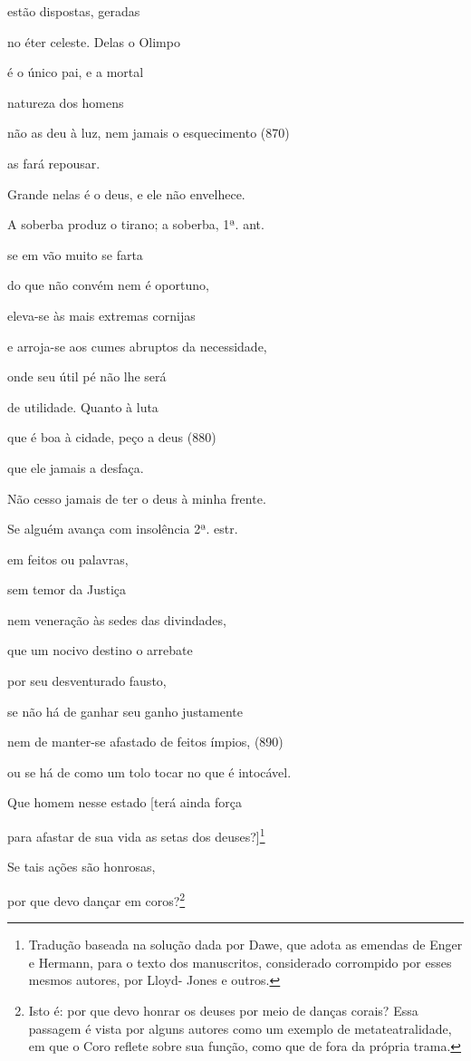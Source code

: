estão dispostas, geradas

no éter celeste. Delas o Olimpo

é o único pai, e a mortal

natureza dos homens

não as deu à luz, nem jamais o esquecimento (870)

as fará repousar.

Grande nelas é o deus, e ele não envelhece.

A soberba produz o tirano; a soberba, 1ª. ant.

se em vão muito se farta

do que não convém nem é oportuno,

eleva-se às mais extremas cornijas

e arroja-se aos cumes abruptos da necessidade,

onde seu útil pé não lhe será

de utilidade. Quanto à luta

que é boa à cidade, peço a deus (880)

que ele jamais a desfaça.

Não cesso jamais de ter o deus à minha frente.

Se alguém avança com insolência 2ª. estr.

em feitos ou palavras,

sem temor da Justiça

nem veneração às sedes das divindades,

que um nocivo destino o arrebate

por seu desventurado fausto,

se não há de ganhar seu ganho justamente

nem de manter-se afastado de feitos ímpios, (890)

ou se há de como um tolo tocar no que é intocável.

Que homem nesse estado {[}terá ainda força

para afastar de sua vida as setas dos deuses?{]}\footnote{Tradução
  baseada na solução dada por Dawe, que adota as emendas de Enger e
  Hermann, para o texto dos manuscritos, considerado corrompido por
  esses mesmos autores, por Lloyd- Jones e outros.}

Se tais ações são honrosas,

por que devo dançar em coros?\footnote{Isto é: por que devo honrar os
  deuses por meio de danças corais? Essa passagem é vista por alguns
  autores como um exemplo de metateatralidade, em que o Coro reflete
  sobre sua função, como que de fora da própria trama.}

